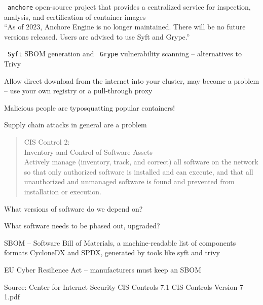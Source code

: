 \documentclass[Screen16to9,17pt]{foils}
\begin{document}

\begin{list2}
\item \faWrench\ \verb+anchore+ open-source project that provides a centralized service for inspection, analysis, and certification of container images
\\
``As of 2023, Anchore Engine is no longer maintained. There will be no future versions released. Users are advised to use Syft and Grype.''
\item \faWrench\ \verb+Syft+  SBOM generation and \faWrench\ \verb+Grype+  vulnerability scanning -- alternatives to Trivy
\item Allow direct download from the internet into your cluster, may become a problem\\
-- use your own registry or a pull-through proxy
\item Malicious people are typosquatting popular containers!
\item Supply chain attacks in general are a problem
\end{list2}



\begin{quote}
CIS Control 2:\\
Inventory and Control of Software Assets\\
Actively manage (inventory, track, and correct) all software on the network so that only authorized software is installed and can execute, and that all unauthorized and unmanaged software is found and prevented from installation or execution.
\end{quote}

\begin{list1}
\item What versions of software do we depend on?
\item What software needs to be phased out, upgraded?
\item SBOM -- Software Bill of Materials, a machine-readable list of components\\
formats CycloneDX and SPDX, generated by tools like syft and trivy
\item EU Cyber Resilience Act -- manufacturers must keep an SBOM
\end{list1}

Source: Center for Internet Security CIS Controls 7.1 CIS-Controls-Version-7-1.pdf
\end{document}
